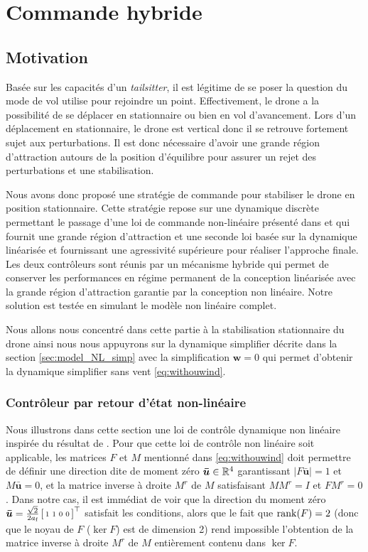 
\chapter{Commande hybride}
\minitoc


\section{Motivation}
Basée sur les capacités d'un \textit{tailsitter}, il est légitime de se poser la question du mode de vol utilise pour rejoindre un point. Effectivement, le drone a la possibilité de se déplacer en stationnaire ou bien en vol d'avancement. Lors d'un déplacement en stationnaire, le drone est vertical donc il se retrouve fortement sujet aux perturbations. Il est donc nécessaire d'avoir une grande région d'attraction autours de la position d'équilibre pour assurer un rejet des perturbations et une stabilisation.

Nous avons donc proposé une stratégie de commande pour stabiliser le drone en position stationnaire. Cette stratégie repose sur une dynamique discrète permettant le passage d'une loi de commande non-linéaire présenté dans \cite{2020e-MicCenZacFra} et qui fournit une grande région d'attraction et une seconde loi basée sur la dynamique linéarisée et fournissant une agressivité supérieure pour réaliser l'approche finale. Les deux contrôleurs sont réunis par un mécanisme hybride qui permet de conserver les performances en régime permanent de la conception linéarisée avec la grande région d'attraction garantie par la conception non linéaire. Notre solution est testée en simulant le modèle non linéaire complet.

Nous allons nous concentré dans cette partie à la stabilisation stationnaire du drone ainsi nous nous appuyrons sur la dynamique simplifier décrite dans la section \ref{sec:model_NL_simp} avec la simplification $\boldsymbol{w} = 0$ qui permet d'obtenir la dynamique simplifier sans vent \eqref{eq:withouwind}. 



\subsection{Contrôleur par retour d'état non-linéaire}
Nous illustrons dans cette section une loi de contrôle dynamique non linéaire inspirée du résultat de \cite{2020e-MicCenZacFra}. Pour que cette loi de contrôle non linéaire soit applicable, les matrices $F$ et $M$ mentionné dans \eqref{eq:withouwind} doit permettre de définir une direction dite de moment zéro $\boldsymbol{\bar u} \in {\mathbb R}^4$ garantissant
$|F\boldsymbol{\bar u}| = 1$ et $M \boldsymbol{\bar u}=0$, et la matrice inverse à droite $M^r$ de $M$ satisfaisant $M M^r = I$ et $FM^r=0$. Dans notre cas, il est immédiat de voir que la direction du moment zéro $\boldsymbol{\bar u} = \frac{\sqrt{2}}{2a_{\text{f}}}\left[ \begin{smallmatrix}1&1&0&0 \end{smallmatrix} \right]^\top$ satisfait les conditions, alors que le fait que $\operatorname{rank}(F) = 2$ (donc que le noyau de $F$ ($\ker F$) est de dimension 2) rend impossible l'obtention de la matrice inverse à droite $M^r$ de $M$ entièrement contenu dans $\ker F$.

